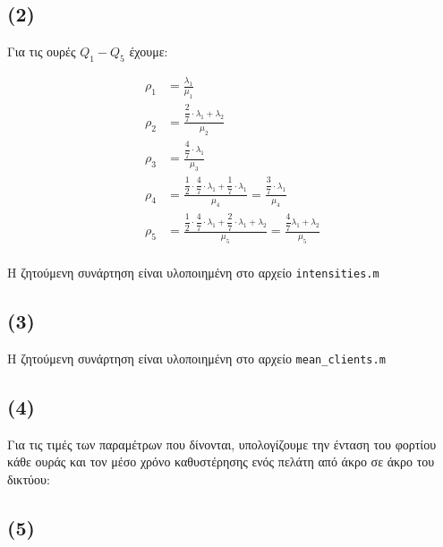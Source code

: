 \documentclass[a4paper]{article}
\begin{document}
\begin{minipage}{\textwidth}
\subsection*{(2)}

Για τις ουρές $Q_1-Q_5$ έχουμε:

\begin{align*}
	ρ_1 &= \frac{λ_1}{μ_1} \\
	ρ_2 &= \frac{\dfrac{2}{7}\cdot λ_1+λ_2}{μ_2} \\
	ρ_3 &= \frac{\dfrac{4}{7}\cdot λ_1}{μ_3} \\
	ρ_4 &= \frac{\dfrac{1}{2}\cdot\dfrac{4}{7}\cdot λ_1+\dfrac{1}{7}\cdot λ_1}{μ_4} = \frac{\dfrac{3}{7}\cdot λ_1}{μ_4} \\
	ρ_5 &= \frac{\dfrac{1}{2}\cdot \dfrac{4}{7} \cdot λ_1 + \dfrac{2}{7} \cdot λ_1 + λ_2}{μ_5} = \frac{\dfrac{4}{7}λ_1 + λ_2}{μ_5} \\
\end{align*}

\end{minipage}

Η ζητούμενη συνάρτηση είναι υλοποιημένη στο αρχείο \texttt{intensities.m}



\subsection*{(3)}

Η ζητούμενη συνάρτηση είναι υλοποιημένη στο αρχείο \texttt{mean\_clients.m}



\begin{minipage}{\textwidth}
\subsection*{(4)}

Για τις τιμές των παραμέτρων που δίνονται, υπολογίζουμε την ένταση του φορτίου κάθε ουράς και τον μέσο χρόνο καθυστέρησης ενός πελάτη από άκρο σε άκρο του δικτύου:



\end{minipage}

\subsection*{(5)}
\end{document}
